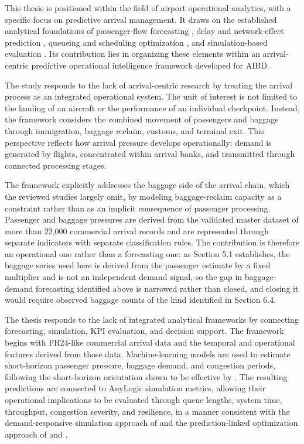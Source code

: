 This thesis is positioned within the field of airport operational analytics, with a specific focus on predictive arrival management. It draws on the established analytical foundations of passenger-flow forecasting \parencite{orsini2019neural}, delay and network-effect prediction \parencite{shao2019flight,shao2022predicting,zhang2021spatiotemporal,zhu2024spatiotemporal}, queueing and scheduling optimization \parencite{cao2025robust,pang2024machine}, and simulation-based evaluation \parencite{sang2026integrating}. Its contribution lies in organizing these elements within an arrival-centric predictive operational intelligence framework developed for AIBD.

The study responds to the lack of arrival-centric research by treating the arrival process as an integrated operational system. The unit of interest is not limited to the landing of an aircraft or the performance of an individual checkpoint. Instead, the framework considers the combined movement of passengers and baggage through immigration, baggage reclaim, customs, and terminal exit. This perspective reflects how arrival pressure develops operationally: demand is generated by flights, concentrated within arrival banks, and transmitted through connected processing stages.

The framework explicitly addresses the baggage side of the arrival chain, which the reviewed studies largely omit, by modeling baggage-reclaim capacity as a constraint rather than as an implicit consequence of passenger processing. Passenger and baggage pressures are derived from the validated master dataset of more than 22,000 commercial arrival records and are represented through separate indicators with separate classification rules. The contribution is therefore an operational one rather than a forecasting one: as Section 5.1 establishes, the baggage series used here is derived from the passenger estimate by a fixed multiplier and is not an independent demand signal, so the gap in baggage-demand forecasting identified above is narrowed rather than closed, and closing it would require observed baggage counts of the kind identified in Section 6.4.

The thesis responds to the lack of integrated analytical frameworks by connecting forecasting, simulation, KPI evaluation, and decision support. The framework begins with FR24-like commercial arrival data and the temporal and operational features derived from those data. Machine-learning models are used to estimate short-horizon passenger pressure, baggage demand, and congestion periods, following the short-horizon orientation shown to be effective by \textcite{orsini2019neural}. The resulting predictions are connected to AnyLogic simulation metrics, allowing their operational implications to be evaluated through queue lengths, system time, throughput, congestion severity, and resilience, in a manner consistent with the demand-responsive simulation approach of \textcite{sang2026integrating} and the prediction-linked optimization approach of \textcite{cao2025robust} and \textcite{pang2024machine}.

